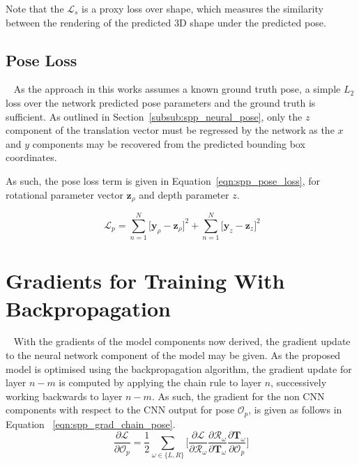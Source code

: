 Note that the \( \mathcal{L}_{s} \) is a proxy loss over shape, which measures the similarity between 
the rendering of the predicted 3D shape under the predicted pose.

\subsection{Pose Loss}
~\label{sec:spp_pose_loss}
As the approach in this works assumes a known ground truth pose, a simple \( L_{2} \) loss over the 
network predicted pose parameters and the ground truth is sufficient. As outlined in Section~\ref{subsub:spp_neural_pose}, 
only the \( z \) component of the translation vector must be regressed by the network as the \( x \) and 
\( y \) components may be recovered from the predicted bounding box coordinates.

As such, the pose loss term is given in Equation~\ref{eqn:spp_pose_loss}, for rotational parameter vector 
\( \bm{z}_{\rho} \) and depth parameter \( z \).

\begin{equation}
  ~\label{eqn:spp_pose_loss}
  \mathcal{L}_{p} = \sum_{n=1}^{N} \Big[ \bm{y}_{\rho} - \bm{z}_{\rho} \Big]^{2} +
  \sum_{n=1}^{N} \Big[ \bm{y}_{z} - \bm{z}_{z} \Big]^{2}
\end{equation}

\section{Gradients for Training With Backpropagation}
~\label{sec:spp_backprop}
With the gradients of the model components now derived, the gradient update to the neural network component 
of the model may be given. As the proposed model is optimised using the backpropagation algorithm, 
the gradient update for layer \( n - m \) is computed by applying the chain rule to layer \( n \), 
successively working backwards to layer \( n - m \). As such, the gradient for the non CNN components 
with respect to the CNN output for pose \( \mathcal{O}_{p} \), is given as follows in Equation
~\ref{eqn:spp_grad_chain_pose}.
\begin{equation}
  \label{eqn:spp_grad_chain_pose}
  \frac{\partial \mathcal{L}}{\partial \mathcal{O}_{p}} = 
  \frac{1}{2} \sum_{\omega \in \{L, R\}} \Bigg[
    \frac{\partial \mathcal{L}}{\partial \mathcal{R}_{\omega}}
    \frac{\partial \mathcal{R}_{\omega}}{\partial \bm{T}_{\omega}}
    \frac{\partial \bm{T}_{\omega}}{\partial \mathcal{O}_{p}}
  \Bigg]
\end{equation}


